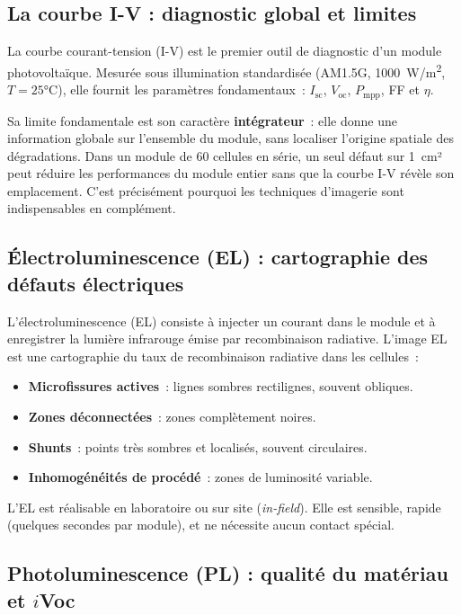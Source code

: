 \documentclass[12pt,a4paper]{report}
\begin{document}
\subsection{La courbe I-V : diagnostic global et limites}

La courbe courant-tension (I-V) est le premier outil de diagnostic d'un module photovoltaïque. Mesurée sous illumination standardisée (AM1.5G, 1000~\si{W/m^2}, $T = 25$°C), elle fournit les paramètres fondamentaux~: $I_\text{sc}$, $V_\text{oc}$, $P_\text{mpp}$, FF et $\eta$.

Sa limite fondamentale est son caractère \textbf{intégrateur}~: elle donne une information globale sur l'ensemble du module, sans localiser l'origine spatiale des dégradations. Dans un module de 60 cellules en série, un seul défaut sur 1~cm² peut réduire les performances du module entier sans que la courbe I-V révèle son emplacement. C'est précisément pourquoi les techniques d'imagerie sont indispensables en complément.

\subsection{Électroluminescence (EL) : cartographie des défauts électriques}

L'électroluminescence (EL) consiste à injecter un courant dans le module et à enregistrer la lumière infrarouge émise par recombinaison radiative. L'image EL est une cartographie du taux de recombinaison radiative dans les cellules~:
\begin{itemize}
  \item \textbf{Microfissures actives}~: lignes sombres rectilignes, souvent obliques.
  \item \textbf{Zones déconnectées}~: zones complètement noires.
  \item \textbf{Shunts}~: points très sombres et localisés, souvent circulaires.
  \item \textbf{Inhomogénéités de procédé}~: zones de luminosité variable.
\end{itemize}

L'EL est réalisable en laboratoire ou sur site (\textit{in-field}). Elle est sensible, rapide (quelques secondes par module), et ne nécessite aucun contact spécial.

\subsection{Photoluminescence (PL) : qualité du matériau et $i$Voc}
\end{document}

